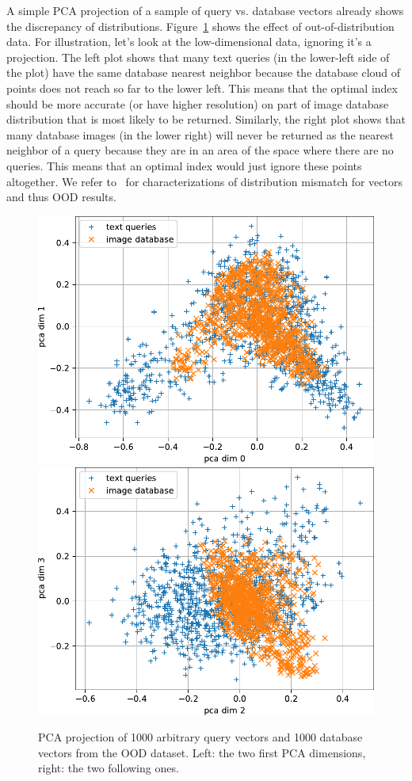 A simple PCA projection of a sample of query vs. database vectors already shows the discrepancy of distributions.
Figure~\ref{fig:pcaOOD} shows the effect of out-of-distribution data. 
For illustration, let's look at the low-dimensional data, ignoring it’s a projection. 
The left plot shows that many text queries (in the lower-left side of the plot)
have the same database nearest neighbor because the database cloud of points does not reach so far to the lower left. 
This means that the optimal index should be more accurate (or have higher resolution)
on part of image database distribution that is most likely to be returned. 
Similarly, the right plot shows that many database images (in the lower right) will never be returned as the nearest neighbor of a query because they are in an area of the space where there are no queries. 
This means that an optimal index would just ignore these points altogether. 
We refer to~\cite{jaiswal2022ooddiskann} for characterizations of distribution mismatch for vectors and thus OOD results.

\begin{figure}
    \centering
    \includegraphics[width=0.45\linewidth]{fig/PCA_OOD_dim0_1.pdf}
    \includegraphics[width=0.45\linewidth]{fig/PCA_OOD_dim2_3.pdf}
    \caption{
    PCA projection of 1000 arbitrary query vectors and 1000 database vectors from the OOD dataset. 
    Left: the two first PCA dimensions, right: the two following ones.     
    }
    \label{fig:pcaOOD}
    \vspace{-.7pt}
\end{figure}


